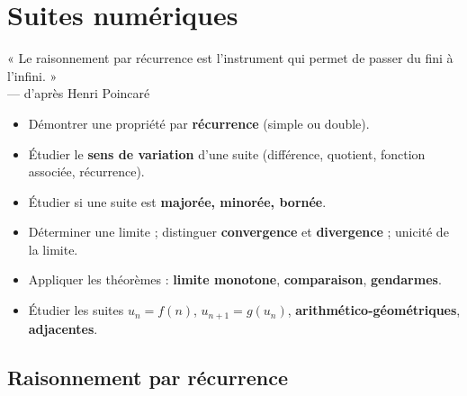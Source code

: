 
\chapter{Suites numériques}

\begin{citationchapitre}
	« Le raisonnement par récurrence est l'instrument qui permet de passer
	du fini à l'infini. »\\[0.4em]
	— d'après Henri Poincaré
\end{citationchapitre}

\begin{objectifs}
	\begin{itemize}[label=\textbullet]
		\item Démontrer une propriété par \textbf{récurrence} (simple ou double).
		\item Étudier le \textbf{sens de variation} d'une suite (différence,
		quotient, fonction associée, récurrence).
		\item Étudier si une suite est \textbf{majorée, minorée, bornée}.
		\item Déterminer une limite ; distinguer \textbf{convergence} et
		\textbf{divergence} ; unicité de la limite.
		\item Appliquer les théorèmes : \textbf{limite monotone},
		\textbf{comparaison}, \textbf{gendarmes}.
		\item Étudier les suites $u_n=f(n)$, $u_{n+1}=g(u_n)$,
		\textbf{arithmético-géométriques}, \textbf{adjacentes}.
	\end{itemize}
\end{objectifs}


\section{Raisonnement par récurrence}

